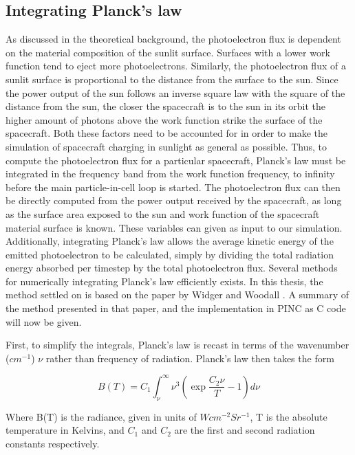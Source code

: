 \subsection{Integrating Planck's law}

As discussed in the theoretical background, the photoelectron flux is dependent on the material composition of the sunlit surface. Surfaces with a lower work function tend to eject more photoelectrons. Similarly, the photoelectron flux of a sunlit surface is proportional to the distance from the surface to the sun. Since the power output of the sun follows an inverse square law with the square of the distance from the sun, the closer the spacecraft is to the sun in its orbit the higher amount of photons above the work function strike the surface of the spacecraft. Both these factors need to be accounted for in order to make the simulation of spacecraft charging in sunlight as general as possible. 
Thus, to compute the photoelectron flux for a particular spacecraft, Planck's law must be integrated in the frequency band from the work function frequency, to infinity before the main particle-in-cell loop is started. The photoelectron flux can then be directly computed from the power output received by the spacecraft, as long as the surface area exposed to the sun and work function of the spacecraft material surface is known. These variables can given as input to our simulation. Additionally, integrating Planck's law allows the average kinetic energy of the emitted photoelectron to be calculated, simply by dividing the total radiation energy absorbed per timestep by the total photoelectron flux.
Several methods for numerically integrating Planck's law efficiently exists. In this thesis, the method settled on is based on the paper by Widger and Woodall . A summary of the method presented in that paper, and the implementation in PINC as C code will now be given.

First, to simplify the integrals, Planck's law is recast in terms of the wavenumber ($cm^{-1}$) $\nu$ rather than frequency of radiation. Planck's law then takes the form

\begin{equation}\label{eq:PlanckNu}
    B(T) = C_1 \int^{\infty}_{\nu} \nu^3 \left(\exp{\frac{C_2 \nu}{T}} - 1 \right) d \nu
\end{equation}

Where B(T) is the radiance, given in units of $W cm^{-2} Sr^{-1}$, T is the absolute temperature in Kelvins, and $C_1$ and $C_2$ are the first and second radiation constants respectively.

